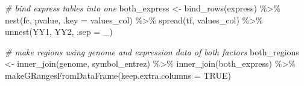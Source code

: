 \documentclass[9pt,a4paper,]{extarticle}
\newenvironment{Shaded}{\begin{snugshade}}{\end{snugshade}}
\newcommand{\AttributeTok}[1]{\textcolor[rgb]{0.77,0.63,0.00}{#1}}
\newcommand{\CommentTok}[1]{\textcolor[rgb]{0.56,0.35,0.01}{\textit{#1}}}
\newcommand{\ConstantTok}[1]{\textcolor[rgb]{0.00,0.00,0.00}{#1}}
\newcommand{\DecValTok}[1]{\textcolor[rgb]{0.00,0.00,0.81}{#1}}
\newcommand{\FunctionTok}[1]{\textcolor[rgb]{0.00,0.00,0.00}{#1}}
\newcommand{\NormalTok}[1]{#1}
\newcommand{\OtherTok}[1]{\textcolor[rgb]{0.56,0.35,0.01}{#1}}
\newcommand{\SpecialCharTok}[1]{\textcolor[rgb]{0.00,0.00,0.00}{#1}}
\newcommand{\StringTok}[1]{\textcolor[rgb]{0.31,0.60,0.02}{#1}}
\begin{document}
\begin{Shaded}
\end{Shaded}

\begin{Shaded}
\begin{Highlighting}[]
\CommentTok{\# bind express tables into one}
\NormalTok{both\_express }\OtherTok{\textless{}{-}} \FunctionTok{bind\_rows}\NormalTok{(express) }\SpecialCharTok{\%\textgreater{}\%}
  \FunctionTok{nest}\NormalTok{(fc, pvalue, }\AttributeTok{.key =} \StringTok{\textquotesingle{}values\_col\textquotesingle{}}\NormalTok{) }\SpecialCharTok{\%\textgreater{}\%}
  \FunctionTok{spread}\NormalTok{(tf, values\_col) }\SpecialCharTok{\%\textgreater{}\%}
  \FunctionTok{unnest}\NormalTok{(YY1, YY2, }\AttributeTok{.sep =} \StringTok{\textquotesingle{}\_\textquotesingle{}}\NormalTok{)}

\CommentTok{\# make regions using genome and expression data of both factors}
\NormalTok{both\_regions }\OtherTok{\textless{}{-}} \FunctionTok{inner\_join}\NormalTok{(genome, symbol\_entrez) }\SpecialCharTok{\%\textgreater{}\%}
  \FunctionTok{inner\_join}\NormalTok{(both\_express) }\SpecialCharTok{\%\textgreater{}\%}
  \FunctionTok{makeGRangesFromDataFrame}\NormalTok{(}\AttributeTok{keep.extra.columns =} \ConstantTok{TRUE}\NormalTok{)}
\end{Highlighting}
\end{Shaded}
\end{document}
